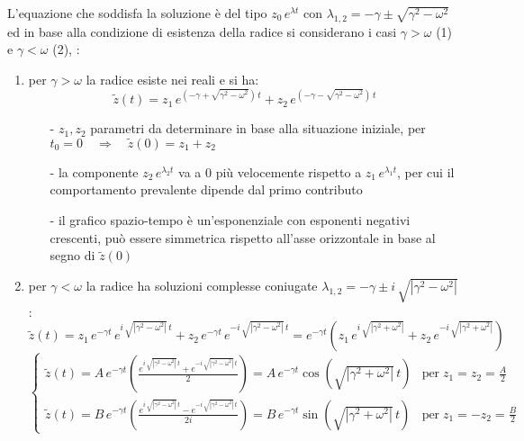 \documentclass[a4paper]{article}
\begin{document}
L'equazione che soddisfa la soluzione è del tipo \(z_0 \, e^{\lambda t}\) con \(\lambda_{1,2} = -\gamma \pm \sqrt{\gamma^2-\omega^2}\) ed
in base alla condizione di esistenza della radice si considerano i casi \(\gamma > \omega\) (1) e \(\gamma < \omega\) (2), :
\begin{enumerate}
	\item per \(\gamma > \omega\) la radice esiste nei reali e si ha:
	\[\tilde{z}(t) = z_1 \, e^{\left(-\gamma + \sqrt{\gamma^2 - \omega^2}\right) \, t} + z_2 \,  e^{\left(-\gamma - \sqrt{\gamma^2 - \omega^2}\right) \, t}\]
	\begin{itemize}[topsep=3pt, itemsep=0pt]
		\item[-] \(z_1, z_2\) parametri da determinare in base alla situazione iniziale, per \(t_0 = 0 \quad \Rightarrow \quad \tilde{z}(0) = z_1 + z_2\)
		\item[-] la componente \(z_2 \, e^{\lambda_2 t}\) va a 0 più velocemente rispetto a \(z_1 \, e^{\lambda_1 t}\), per cui
		il comportamento prevalente dipende dal primo contributo
		\item[-] il grafico spazio-tempo è un'esponenziale con esponenti negativi crescenti, può essere simmetrica rispetto
		all'asse orizzontale in base al segno di \(\tilde{z}(0)\)
	\end{itemize}
	\item per \(\gamma < \omega\) la radice ha soluzioni complesse coniugate \(\lambda_{1,2} = -\gamma \pm i \, \sqrt{\left|\gamma^2 - \omega^2\right|}\):
	\setcounter{equation}{0}
	\begin{equation}
		\label{eq1}
		\tilde{z}(t) = z_1 \, e^{-\gamma t} \, e^{i \, \sqrt{\left|\gamma^2 - \omega^2\right|} \, t} + z_2 \, e^{-\gamma t} \, e^{-i \, \sqrt{\left|\gamma^2 - \omega^2\right|} \, t} =
		e^{-\gamma t} \left(z_1 \, e^{i \, \sqrt{\left|\gamma^2 + \omega^2\right|}} + z_2 \, e^{-i \, \sqrt{\left|\gamma^2 + \omega^2\right|}}\right)
	\end{equation}
	\begin{equation}
		\label{eq2}
		\begin{cases}
			\tilde{z}(t) = A \, e^{-\gamma t} \left( \frac{e^{i \, \sqrt{\left|\gamma^2 - \omega^2\right|} \, t} + e^{-i \, \sqrt{\left|\gamma^2 - \omega^2\right|} \, t}}{2}\right) = A \, e^{-\gamma t} \cos \left(\sqrt{\left|\gamma^2 + \omega^2\right|} \, t\right) &\text{per} \; z_1 = z_2 = \frac{A}{2} \\
			\tilde{z}(t) = B \, e^{-\gamma t} \left( \frac{e^{i \, \sqrt{\left|\gamma^2 - \omega^2\right|} \, t} - e^{-i \, \sqrt{\left|\gamma^2 - \omega^2\right|} \, t}}{2i}\right) = B \, e^{-\gamma t} \sin \left(\sqrt{\left|\gamma^2 + \omega^2\right|} \, t\right) &\text{per} \; z_1 = - z_2 = \frac{B}{2}

\end{cases}
\end{equation}
\end{enumerate}
\end{document}
